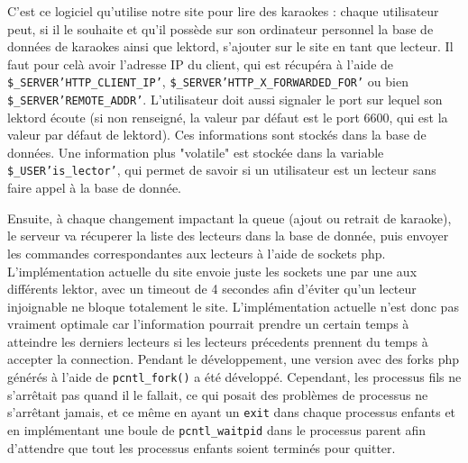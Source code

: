 C'est ce logiciel qu'utilise notre site pour lire des karaokes : chaque utilisateur peut, si il le souhaite et qu'il possède sur son ordinateur personnel la base de données de karaokes ainsi que lektord, s'ajouter sur le site en tant que lecteur. Il faut pour celà avoir l'adresse IP du client, qui est récupéra à l'aide de \texttt{\$\_SERVER\lbrack'HTTP\_CLIENT\_IP'\rbrack}, \texttt{\$\_SERVER\lbrack'HTTP\_X\_FORWARDED\_FOR'\rbrack} ou bien \texttt{\$\_SERVER\lbrack'REMOTE\_ADDR'\rbrack}.
L'utilisateur doit aussi signaler le port sur lequel son lektord écoute (si non renseigné, la valeur par défaut est le port 6600, qui est la valeur par défaut de lektord).
Ces informations sont stockés dans la base de données.
Une information plus "volatile" est stockée dans la variable \texttt{\$\_USER\lbrack'is\_lector'\rbrack}, qui permet de savoir si un utilisateur est un lecteur sans faire appel à la base de donnée.

Ensuite, à chaque changement impactant la queue (ajout ou retrait de karaoke), le serveur va récuperer la liste des lecteurs dans la base de donnée, puis envoyer les commandes correspondantes aux lecteurs à l'aide de sockets php.
L'implémentation actuelle du site envoie juste les sockets une par une aux différents lektor, avec un timeout de 4 secondes afin d'éviter qu'un lecteur injoignable ne bloque totalement le site. L'implémentation actuelle n'est donc pas vraiment optimale car l'information pourrait prendre un certain temps à atteindre les derniers lecteurs si les lecteurs précedents prennent du temps à accepter la connection. Pendant le développement, une version avec des forks php générés à l'aide de
\texttt{pcntl\_fork()} a été développé. Cependant, les processus fils ne s'arrêtait pas quand il le fallait, ce qui posait des problèmes de processus ne s'arrêtant jamais, et ce même en ayant un \texttt{exit} dans chaque processus enfants et en implémentant une boule de \texttt{pcntl_waitpid} dans le processus parent afin d'attendre que tout les processus enfants soient terminés pour quitter.
